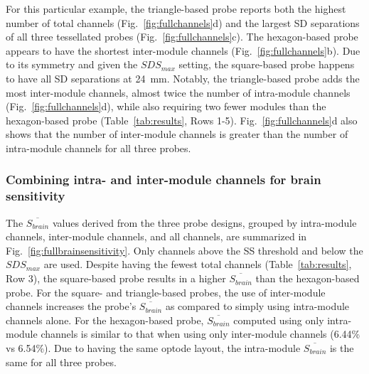 \begin{figure}
\end{figure} 

For this particular example, the triangle-based probe reports both the highest number of total channels (Fig.~\ref{fig:fullchannels}d) and the largest \ac{SD} separations of all three tessellated probes (Fig.~\ref{fig:fullchannels}c). The hexagon-based probe appears to have the shortest inter-module channels (Fig.~\ref{fig:fullchannels}b). Due to its symmetry and given the $SDS_{max}$ setting, the square-based probe happens to have all \ac{SD} separations at 24~mm. Notably, the triangle-based probe adds the most inter-module channels, almost twice the number of intra-module channels (Fig.~\ref{fig:fullchannels}d), while also requiring two fewer modules than the hexagon-based probe (Table~\ref{tab:results}, Rows 1-5). Fig.~\ref{fig:fullchannels}d also shows that the number of inter-module channels is greater than the number of intra-module channels for all three probes.


\subsubsection{Combining intra- and inter-module channels for brain sensitivity}
The $\overline{S_{brain}}$ values derived from the three probe designs, grouped by intra-module channels, inter-module channels, and all channels, are summarized in Fig.~\ref{fig:fullbrainsensitivity}. Only channels above the \ac{SS} threshold and below the $SDS_{max}$ are used. Despite having the fewest total channels (Table~\ref{tab:results}, Row 3), the square-based probe results in a higher $\overline{S_{brain}}$ than the hexagon-based probe. For the square- and triangle-based probes, the use of inter-module channels increases the probe's $\overline{S_{brain}}$ as compared to simply using intra-module channels alone. For the hexagon-based probe, $\overline{S_{brain}}$ computed using only intra-module channels is similar to that when using only inter-module channels (6.44\% vs 6.54\%). Due to having the same optode layout, the intra-module $\overline{S_{brain}}$ is the same for all three probes. 

